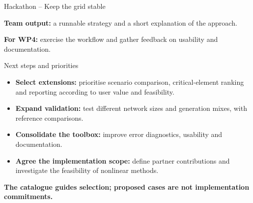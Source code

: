 \documentclass[aspectratio=1609,9pt]{beamer}
\begin{document}
\begin{frame}[t]{Hackathon -- Keep the grid stable}
  \par\vspace{2ex}
  \raggedright
  \textbf{Team output:} a runnable strategy and a short explanation of the approach.
  \par\vspace{1ex}
  {\color{tgpetrol}\textbf{For WP4:} exercise the workflow and gather feedback on usability and documentation.}
\end{frame}

\begin{frame}[t]{Next steps and priorities}
  \vspace{1ex}
  \begin{itemize}\setlength{\itemsep}{1.8ex}
    \item \textbf{Select extensions:} prioritise scenario comparison, critical-element ranking and reporting according to user value and feasibility.
    \item \textbf{Expand validation:} test different network sizes and generation mixes, with reference comparisons.
    \item \textbf{Consolidate the toolbox:} improve error diagnostics, usability and documentation.
    \item \textbf{Agree the implementation scope:} define partner contributions and investigate the feasibility of nonlinear methods.
  \end{itemize}
  \vfill
  {\color{tgpetrol}\textbf{The catalogue guides selection; proposed cases are not implementation commitments.}}
\end{frame}
\end{document}

